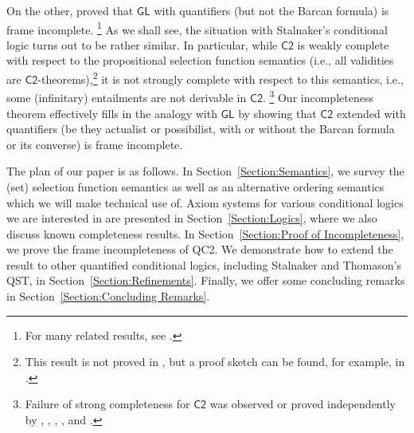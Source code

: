\documentclass[12pt]{article}
\begin{document}
On the other, \cite{Montagna1984provability} proved that $\mathsf{GL}$ with quantifiers (but not the Barcan formula) is frame incomplete.%
\footnote{
    For many related results, see \cite{Rybakov2024incompleteness}.
    } %
As we shall see, the situation with Stalnaker's conditional logic turns out to be rather similar. 
In particular, while $\mathsf{C2}$ is weakly complete with respect to the propositional selection function semantics (i.e., all validities are $\mathsf{C2}$-theorems),\footnote{This result is not proved in \cite{Stalnaker1968theory}, but a proof sketch can be found, for example, in \cite[\S6]{vanFraassen1974hiddenvariables}.}
it is not strongly complete with respect to this semantics, i.e., some (infinitary) entailments are not derivable in $\mathsf{C2}$.%
\footnote{
    Failure of strong completeness for $\mathsf{C2}$ was observed or proved independently by \cite[\S6]{vanFraassen1974hiddenvariables}, \cite[p.~105]{Veltman1985logics}, \cite[fn.\ 2]{fine2012difficulty}, \cite{kocurek2025stalnaker}, and \cite{dorr2024logic}.
    } %
Our incompleteness theorem effectively fills in the analogy with $\mathsf{GL}$ by showing that $\mathsf{C2}$ extended with quantifiers (be they actualist or possibilist, with or without the Barcan formula or its converse) is frame incomplete. 

The plan of our paper is as follows. In Section~\ref{Section:Semantics}, we survey the (set) selection function semantics as well as an alternative ordering semantics which we will make technical use of. 
Axiom systems for various conditional logics we are interested in are presented in Section~\ref{Section:Logics}, where we also discuss known completeness results. 
In Section~\ref{Section:Proof of Incompleteness}, we prove the frame incompleteness of \textsf{QC2}. 
We demonstrate how to extend the result to other quantified conditional logics, including Stalnaker and Thomason's \textsf{QST}, in Section~\ref{Section:Refinements}. 
Finally, we offer some concluding remarks in Section~\ref{Section:Concluding Remarks}.


\end{document}
